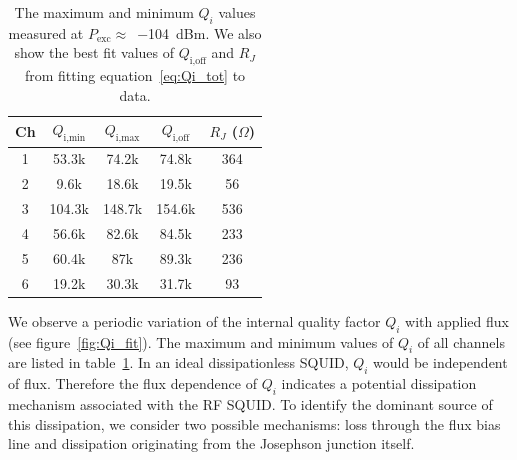 \documentclass[10pt]{iopart}
\begin{document}
\begin{table}[htb]
    \centering
    \begin{tabular}{c c c c c}
    \hline
         Ch & $Q_{\text{i,min}}$ & $Q_{\text{i,max}}$ & $Q_{\text{i,off}}$ & $R_J$ ($\Omega$) \\
    \hline
    1 & 53.3k & 74.2k & 74.8k & 364 \\
    2 & 9.6k & 18.6k & 19.5k & 56 \\
    3 & 104.3k & 148.7k & 154.6k & 536 \\
    4 & 56.6k & 82.6k & 84.5k & 233 \\
    5 & 60.4k & 87k & 89.3k & 236 \\
    6 & 19.2k & 30.3k & 31.7k & 93 \\
    \hline
    \end{tabular}
    \caption{The maximum and minimum $Q_i$ values measured at \mbox{$P_{\text{exc}}\approx$~\qty{-104}{dBm}}. We also show the best fit values of $Q_{\text{i,off}}$ and $R_J$ from fitting equation~\eqref{eq:Qi_tot} to data.}
    \label{tab:R_sg_fits}
\end{table}

We observe a periodic variation of the internal quality factor $Q_i$ with applied flux (see figure~\ref{fig:Qi_fit}). The maximum and minimum values of $Q_i$ of all channels are listed in table~\ref{tab:R_sg_fits}. In an ideal dissipationless SQUID, $Q_i$ would be independent of flux. Therefore the flux dependence of $Q_i$ indicates a potential dissipation mechanism associated with the RF SQUID. To identify the dominant source of this dissipation, we consider two possible mechanisms: loss through the flux bias line and dissipation originating from the Josephson junction itself.
\end{document}
